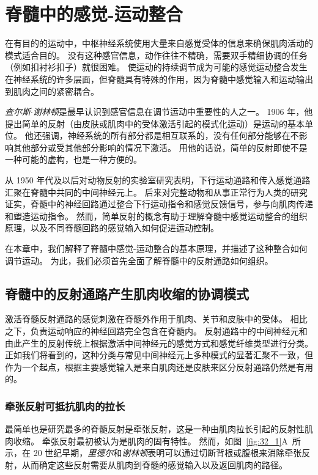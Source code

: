 \chapter{脊髓中的感觉-运动整合} \label{chap:chap32}

在有目的的运动中，中枢神经系统使用大量来自感觉受体的信息来确保肌肉活动的模式适合目的。
没有这种感官信息，动作往往不精确，需要双手精细协调的任务（例如扣衬衫扣子）就很困难。
使运动的持续调节成为可能的感觉运动整合发生在神经系统的许多层面，但脊髓具有特殊的作用，因为脊髓中感觉输入和运动输出到肌肉之间的紧密耦合。


\textit{查尔斯$\cdot$谢林顿}是最早认识到感官信息在调节运动中重要性的人之一。
1906 年，他提出简单的反射（由皮肤或肌肉中的受体激活引起的模式化运动）是运动的基本单位。
他还强调，神经系统的所有部分都是相互联系的，没有任何部分能够在不影响其他部分或受其他部分影响的情况下激活。
用他的话说，简单的反射即使不是一种可能的虚构，也是一种方便的。


从 1950 年代及以后对动物反射的实验室研究表明，下行运动通路和传入感觉通路汇聚在脊髓中共同的中间神经元上。
后来对完整动物和从事正常行为人类的研究证实，脊髓中的神经回路通过整合下行运动指令和感觉反馈信号，参与向肌肉传递和塑造运动指令。
然而，简单反射的概念有助于理解脊髓中感觉运动整合的组织原理，以及不同脊髓回路的感觉输入如何促进运动控制。


在本章中，我们解释了脊髓中感觉-运动整合的基本原理，并描述了这种整合如何调节运动。
为此，我们必须首先全面了解脊髓中的反射通路如何组织。



\section{脊髓中的反射通路产生肌肉收缩的协调模式}

激活脊髓反射通路的感觉刺激在脊髓外作用于肌肉、关节和皮肤中的受体。
相比之下，负责运动响应的神经回路完全包含在脊髓内。 
反射通路中的中间神经元和由此产生的反射传统上根据激活中间神经元的感觉方式和感觉纤维类型进行分类。
正如我们将看到的，这种分类与常见中间神经元上多种模式的显著汇聚不一致，但作为一个起点，根据主要感觉输入是来自肌肉还是皮肤来区分反射通路仍然是有用的。



\subsection{牵张反射可抵抗肌肉的拉长}

最简单也是研究最多的脊髓反射是牵张反射，这是一种由肌肉拉长引起的反射性肌肉收缩。
牵张反射最初被认为是肌肉的固有特性。
然而，如图~\ref{fig:32_1}A~所示，在 20 世纪早期，\textit{里德尔}和\textit{谢林顿}表明可以通过切断背根或腹根来消除牵张反射，从而确定这些反射需要从肌肉到脊髓的感觉输入以及返回肌肉的路径。


